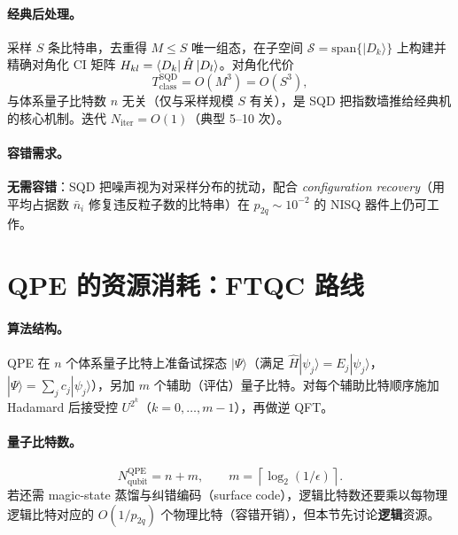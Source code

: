 \documentclass[11pt]{article}
\newcommand{\eps}{\epsilon}
\newcommand{\Oof}[1]{O(#1)}
\newcommand{\ceil}[1]{\left\lceil #1 \right\rceil}
\begin{document}
\paragraph{经典后处理。} 采样 $S$ 条比特串，去重得 $M\le S$ 唯一组态，在子空间 $\mathcal S=\mathrm{span}\{|D_k\rangle\}$ 上构建并精确对角化 CI 矩阵 $H_{kl}=\bra{D_k}\hat H\ket{D_l}$。对角化代价
\begin{equation}
  T_{\mathrm{class}}^{\mathrm{SQD}} = \Oof{M^3} = \Oof{S^3},
\end{equation}
与体系量子比特数 $n$ 无关（仅与采样规模 $S$ 有关），是 SQD 把指数墙推给经典机的核心机制。迭代 $N_{\mathrm{iter}}=\Oof{1}$（典型 5--10 次）。

\paragraph{容错需求。} \textbf{无需容错}：SQD 把噪声视为对采样分布的扰动，配合 \emph{configuration recovery}（用平均占据数 $\bar n_i$ 修复违反粒子数的比特串）在 $p_{2q}\sim 10^{-2}$ 的 NISQ 器件上仍可工作。

\section{QPE 的资源消耗：FTQC 路线}
\paragraph{算法结构。} QPE 在 $n$ 个体系量子比特上准备试探态 $|\Psi\rangle$（满足 $\hat H|\psi_j\rangle=E_j|\psi_j\rangle$，$|\Psi\rangle=\sum_j c_j|\psi_j\rangle$），另加 $m$ 个辅助（评估）量子比特。对每个辅助比特顺序施加 Hadamard 后接受控 $U^{2^k}$（$k=0,\dots,m-1$），再做逆 QFT。

\paragraph{量子比特数。}
\begin{equation}\label{eq:qpe-qubit}
  \boxed{N_{\text{qubit}}^{\mathrm{QPE}} = n + m, \qquad m=\ceil{\log_2(1/\eps)}.}
\end{equation}
若还需 magic-state 蒸馏与纠错编码（surface code），逻辑比特数还要乘以每物理逻辑比特对应的 $\Oof{1/p_{2q}}$ 个物理比特（容错开销），但本节先讨论\textbf{逻辑}资源。
\end{document}
